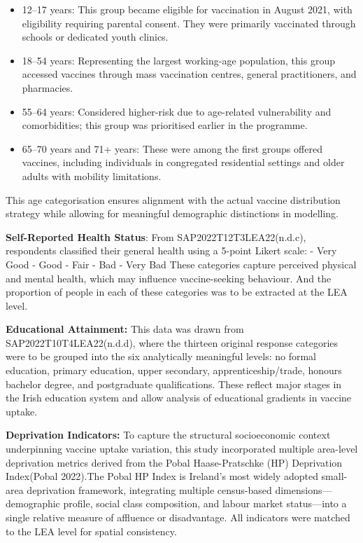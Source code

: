 \documentclass{article}
\begin{document}
\begin{itemize}
\item
  12--17 years: This group became eligible for vaccination in August
  2021, with eligibility requiring parental consent. They were primarily
  vaccinated through schools or dedicated youth clinics.
\item
  18--54 years: Representing the largest working-age population, this
  group accessed vaccines through mass vaccination centres, general
  practitioners, and pharmacies.
\item
  55--64 years: Considered higher-risk due to age-related vulnerability
  and comorbidities; this group was prioritised earlier in the
  programme.
\item
  65--70 years and 71+ years: These were among the first groups offered
  vaccines, including individuals in congregated residential settings
  and older adults with mobility limitations.
\end{itemize}

This age categorisation ensures alignment with the actual vaccine
distribution strategy while allowing for meaningful demographic
distinctions in modelling.

\textbf{Self-Reported Health Status}: From SAP2022T12T3LEA22(n.d.c),
respondents classified their general health using a 5-point Likert
scale: - Very Good - Good - Fair - Bad - Very Bad These categories
capture perceived physical and mental health, which may influence
vaccine-seeking behaviour. And the proportion of people in each of these
categories was to be extracted at the LEA level.

\textbf{Educational Attainment:} This data was drawn from
SAP2022T10T4LEA22(n.d.d), where the thirteen original response
categories were to be grouped into the six analytically meaningful
levels: no formal education, primary education, upper secondary,
apprenticeship/trade, honours bachelor degree, and postgraduate
qualifications. These reflect major stages in the Irish education system
and allow analysis of educational gradients in vaccine uptake.

\textbf{Deprivation Indicators:} To capture the structural socioeconomic
context underpinning vaccine uptake variation, this study incorporated
multiple area-level deprivation metrics derived from the Pobal
Haase-Pratschke (HP) Deprivation Index(Pobal 2022).The Pobal HP Index is
Ireland's most widely adopted small-area deprivation framework,
integrating multiple census-based dimensions---demographic profile,
social class composition, and labour market status---into a single
relative measure of affluence or disadvantage. All indicators were
matched to the LEA level for spatial consistency.
\end{document}
